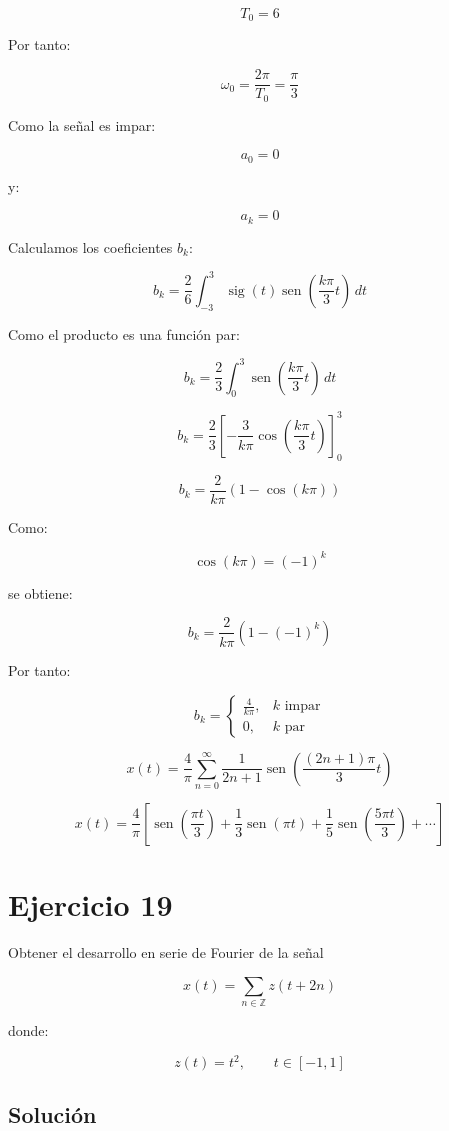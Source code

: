 \documentclass[fleqn]{article}
\DeclareMathOperator{\sen}{sen}
\begin{document}
	\[
	T_0=6
	\]

	Por tanto:

	\[
	\omega_0
	=
	\frac{2\pi}{T_0}
	=
	\frac{\pi}{3}
	\]

	Como la señal es impar:

	\[
	a_0=0
	\]

	y:

	\[
	a_k=0
	\]

	Calculamos los coeficientes $b_k$:

	\[
	b_k
	=
	\frac{2}{6}
	\int_{-3}^{3}
	\operatorname{sig}(t)
	\sen\left(\frac{k\pi}{3}t\right)\,dt
	\]

	Como el producto es una función par:

	\[
	b_k
	=
	\frac{2}{3}
	\int_0^3
	\sen\left(\frac{k\pi}{3}t\right)\,dt
	\]

	\[
	b_k
	=
	\frac{2}{3}
	\left[
	-\frac{3}{k\pi}
	\cos\left(\frac{k\pi}{3}t\right)
	\right]_0^3
	\]

	\[
	b_k
	=
	\frac{2}{k\pi}
	\left(
	1-\cos(k\pi)
	\right)
	\]

	Como:

	\[
	\cos(k\pi)=(-1)^k
	\]

	se obtiene:

	\[
	b_k
	=
	\frac{2}{k\pi}
	\left(
	1-(-1)^k
	\right)
	\]

	Por tanto:

	\[
	b_k=
	\begin{cases}
	\displaystyle\frac{4}{k\pi}, & k\text{ impar} \\[2mm]
	0, & k\text{ par}
	\end{cases}
	\]

	\[
	\boxed{
	x(t)
	=
	\frac{4}{\pi}
	\sum_{n=0}^{\infty}
	\frac{1}{2n+1}
	\sen\left(
	\frac{(2n+1)\pi}{3}t
	\right)
	}
	\]

	\[
	\boxed{
	x(t)
	=
	\frac{4}{\pi}
	\left[
	\sen\left(\frac{\pi t}{3}\right)
	+
	\frac{1}{3}\sen(\pi t)
	+
	\frac{1}{5}\sen\left(\frac{5\pi t}{3}\right)
	+\cdots
	\right]
	}
	\]

\section{Ejercicio 19}
	Obtener el desarrollo en serie de Fourier de la señal

	\[
	x(t)=\sum_{n\in\mathbb{Z}}z(t+2n)
	\]

	donde:

	\[
	z(t)=t^2,
	\qquad
	t\in[-1,1]
	\]

	\subsection{Solución}
\end{document}
